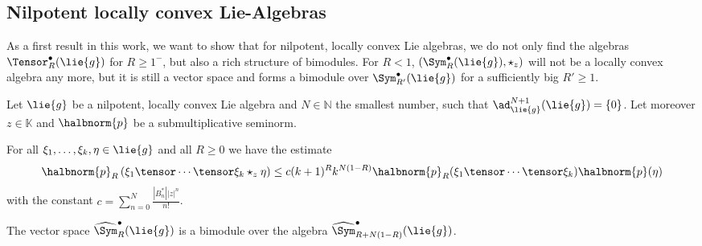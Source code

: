 \documentclass[
11pt,                          %
english                        %
]{article}
\begin{document}
\subsection{Nilpotent locally convex Lie-Algebras}
As a first result in this work, we want to show that for nilpotent, locally convex 
Lie algebras, we do not only find the algebras $\Tensor_R^{\bullet}(\lie{g})$ for 
$R \geq 1^-$, but also a rich structure of bimodules. For $R < 1$, 
$\left( \Sym_R^{\bullet}(\lie{g}), \star_z \right)$ will not be a locally convex 
algebra any more, but it is still a vector space and forms a bimodule over 
$\Sym_{R'}^{\bullet}(\lie{g})$ for a sufficiently big $R' \geq 1$.
\begin{proposition}
	\label{prop:bimodules}
	Let $\lie{g}$ be a nilpotent, locally convex Lie algebra and $N \in \mathbb{N}$ 
	the smallest number, such that $\ad_{\lie{g}}^{N+1}(\lie{g}) = \{ 0 \}$. Let 
	moreover $z \in \mathbb{K}$ and $\halbnorm{p}$ be a submultiplicative seminorm.
	\begin{propositionlist}
		\item
		For all $\xi_1, \ldots, \xi_k, \eta \in \lie{g}$ and all $R \geq 0$ we have 
		the estimate
		\begin{equation}
			\halbnorm{p}_R
			\left(
				\xi_1 \tensor \cdots \tensor \xi_k \star_z \eta
			\right)
			\leq
			c (k+1)^R k^{N(1-R)}
			\halbnorm{p}_R(\xi_1 \tensor \cdots \tensor \xi_k)
			\halbnorm{p}(\eta)
		\end{equation}
		with the constant $c = \sum_{n = 0}^N \frac{|B_n^*| |z|^n}{n!}$.
		
		\item
		The vector space $\widehat{\Sym}_R^{\bullet}(\lie{g})$ is a bimodule over 
		the algebra $\widehat{\Sym}_{R + N(1-R)}^{\bullet}(\lie{g})$.
	\end{propositionlist}
\end{proposition}
\end{document}
